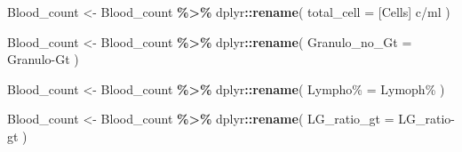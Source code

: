 \documentclass[
]{article}
\newenvironment{Shaded}{\begin{snugshade}}{\end{snugshade}}
\newcommand{\AttributeTok}[1]{\textcolor[rgb]{0.13,0.29,0.53}{#1}}
\newcommand{\FunctionTok}[1]{\textcolor[rgb]{0.13,0.29,0.53}{\textbf{#1}}}
\newcommand{\NormalTok}[1]{#1}
\newcommand{\OtherTok}[1]{\textcolor[rgb]{0.56,0.35,0.01}{#1}}
\newcommand{\SpecialCharTok}[1]{\textcolor[rgb]{0.81,0.36,0.00}{\textbf{#1}}}
\newcommand{\StringTok}[1]{\textcolor[rgb]{0.31,0.60,0.02}{#1}}
\begin{document}
\begin{Shaded}
\end{Shaded}

\begin{Shaded}
\begin{Highlighting}[]
\NormalTok{Blood\_count }\OtherTok{\textless{}{-}}\NormalTok{ Blood\_count }\SpecialCharTok{\%\textgreater{}\%}
\NormalTok{  dplyr}\SpecialCharTok{::}\FunctionTok{rename}\NormalTok{(}
    \StringTok{\textasciigrave{}}\AttributeTok{total\_cell}\StringTok{\textasciigrave{}} \OtherTok{=} \StringTok{\textasciigrave{}}\AttributeTok{[Cells] c/ml}\StringTok{\textasciigrave{}}
\NormalTok{  )}
\end{Highlighting}
\end{Shaded}

\begin{Shaded}
\begin{Highlighting}[]
\NormalTok{Blood\_count }\OtherTok{\textless{}{-}}\NormalTok{ Blood\_count }\SpecialCharTok{\%\textgreater{}\%}
\NormalTok{  dplyr}\SpecialCharTok{::}\FunctionTok{rename}\NormalTok{(}
    \StringTok{\textasciigrave{}}\AttributeTok{Granulo\_no\_Gt}\StringTok{\textasciigrave{}} \OtherTok{=} \StringTok{\textasciigrave{}}\AttributeTok{Granulo{-}Gt}\StringTok{\textasciigrave{}}
\NormalTok{  )}
\end{Highlighting}
\end{Shaded}

\begin{Shaded}
\begin{Highlighting}[]
\NormalTok{Blood\_count }\OtherTok{\textless{}{-}}\NormalTok{ Blood\_count }\SpecialCharTok{\%\textgreater{}\%}
\NormalTok{  dplyr}\SpecialCharTok{::}\FunctionTok{rename}\NormalTok{(}
    \StringTok{\textasciigrave{}}\AttributeTok{Lympho\%}\StringTok{\textasciigrave{}} \OtherTok{=} \StringTok{\textasciigrave{}}\AttributeTok{Lymoph\%}\StringTok{\textasciigrave{}}
\NormalTok{  )}
\end{Highlighting}
\end{Shaded}

\begin{Shaded}
\begin{Highlighting}[]
\NormalTok{Blood\_count }\OtherTok{\textless{}{-}}\NormalTok{ Blood\_count }\SpecialCharTok{\%\textgreater{}\%}
\NormalTok{  dplyr}\SpecialCharTok{::}\FunctionTok{rename}\NormalTok{(}
    \StringTok{\textasciigrave{}}\AttributeTok{LG\_ratio\_gt}\StringTok{\textasciigrave{}} \OtherTok{=} \StringTok{\textasciigrave{}}\AttributeTok{LG\_ratio{-}gt}\StringTok{\textasciigrave{}}
\NormalTok{  )}
\end{Highlighting}
\end{Shaded}
\end{document}
